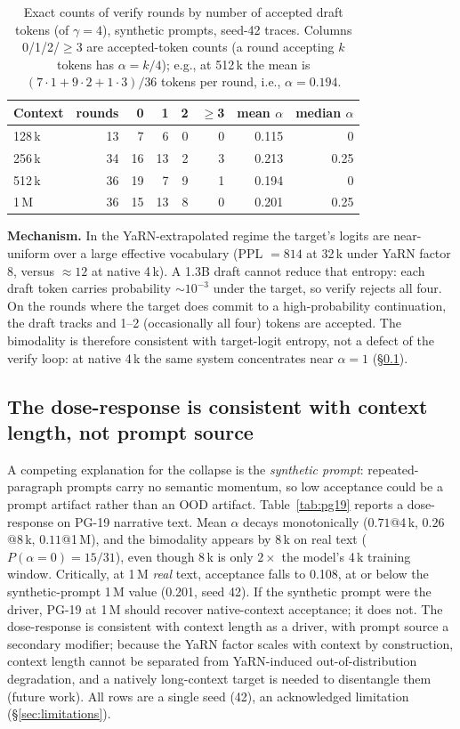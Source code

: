 \documentclass{article}
\begin{document}
\begin{table}[t]
\centering
\footnotesize
\caption{Exact counts of verify rounds by number of accepted draft
tokens (of $\gamma=4$), synthetic prompts, seed-42 traces.
Columns 0/1/2/$\ge$3 are accepted-token counts (a round accepting
$k$ tokens has $\alpha = k/4$); e.g., at 512\,k the mean is
$(7\cdot1 + 9\cdot2 + 1\cdot3)/36$ tokens per round, i.e.,
$\alpha = 0.194$.}
\label{tab:distribution}
\begin{tabular}{lrrrrrrr}
\toprule
Context & rounds & 0 & 1 & 2 & $\ge$3 & mean $\alpha$ & median $\alpha$ \\
\midrule
128\,k & 13 & 7  & 6 & 0 & 0 & 0.115 & 0 \\
256\,k & 34 & 16 & 13 & 2 & 3 & 0.213 & 0.25 \\
512\,k & 36 & 19 & 7  & 9 & 1 & 0.194 & 0 \\
1\,M   & 36 & 15 & 13 & 8 & 0 & 0.201 & 0.25 \\
\bottomrule
\end{tabular}
\end{table}

\textbf{Mechanism.} In the YaRN-extrapolated regime the target's
logits are near-uniform over a large effective vocabulary (PPL
$=814$ at 32\,k under YaRN factor 8, versus ${\approx}12$ at
native 4\,k). A 1.3B draft cannot reduce that entropy: each draft
token carries probability ${\sim}10^{-3}$ under the target, so
verify rejects all four. On the rounds where the target does
commit to a high-probability continuation, the draft tracks and
1--2 (occasionally all four) tokens are accepted. The bimodality
is therefore consistent with target-logit entropy, not a defect of
the verify loop: at native
4\,k the same system concentrates near $\alpha = 1$
(\S\ref{sec:dose-response}).

\subsection{The dose-response is consistent with context length, not prompt source}
\label{sec:dose-response}

A competing explanation for the collapse is the \emph{synthetic
prompt}: repeated-paragraph prompts carry no semantic momentum, so
low acceptance could be a prompt artifact rather than an OOD
artifact. Table~\ref{tab:pg19} reports a dose-response on PG-19
narrative text. Mean $\alpha$ decays monotonically
($0.71$@4\,k, $0.26$@8\,k, $0.11$@1\,M), and the bimodality
appears by 8\,k on real text ($P(\alpha{=}0) = 15/31$), even
though 8\,k is only $2\times$ the model's 4\,k training window.
Critically, at 1\,M \emph{real} text, acceptance falls to 0.108,
at or below the synthetic-prompt 1\,M value (0.201, seed 42). If
the synthetic prompt were the driver, PG-19 at 1\,M should recover
native-context acceptance; it does not. The dose-response is consistent with context length as
a driver, with prompt source a secondary modifier; because the
YaRN factor scales with context by construction, context length
cannot be separated from YaRN-induced out-of-distribution
degradation, and a natively long-context target is needed to
disentangle them (future work). All rows are a single seed (42), an acknowledged
limitation (\S\ref{sec:limitations}).
\end{document}
